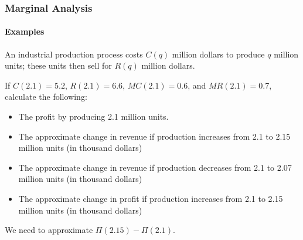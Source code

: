 \documentclass[9pt,xcolor=x11names,compress]{beamer}
\begin{document}
\begin{frame}\frametitle{Marginal Analysis}
\framesubtitle{Examples}
\begin{example}
	An industrial production process costs $C(q)$ million dollars to produce $q$ million units; these units then sell for $R(q)$ million dollars.

	If $C(2.1)=5.2$, $R(2.1)=6.6$, $MC(2.1)=0.6$, and $MR(2.1)=0.7$, calculate the following:
	\begin{itemize}
		\item The profit by producing 2.1 million units.
		\item The approximate change in revenue if production increases from 2.1 to 2.15 million units (in thousand dollars)
		\item The approximate change in revenue if production decreases from 2.1 to 2.07 million units (in thousand dollars)
		\item \alert{The approximate change in profit if production increases from 2.1 to 2.15 million units (in thousand dollars)}
	\end{itemize}
\end{example}
We need to approximate $\Pi(2.15)-\Pi(2.1)$.  
\end{frame}
\end{document}
